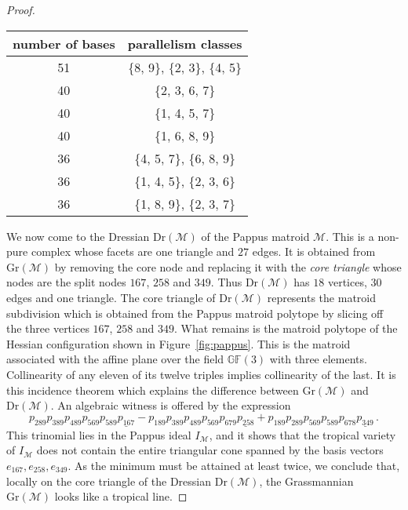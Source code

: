 \documentclass[12pt,a4paper]{amsart}
\theoremstyle{definition}
\newcommand{\Gr}{{\mathrm{Gr}}}
\newcommand{\Dr}{{\mathrm{Dr}}}
\providecommand\cM{{\mathscr{M}}}
\providecommand{\GF}{{\mathbb{GF}}}
\begin{document}
\begin{proof}
  \begin{table}[ht]\centering
    \begin{tabular*}{.5\linewidth}{@{\extracolsep{\fill}}cc@{}}
      \toprule
      number of bases  &   parallelism classes \\
      \midrule
      51          &   \{8, 9\}, \{2, 3\}, \{4, 5\}\\
      40          &        \{2, 3, 6, 7\}\\
      40          &        \{1, 4, 5, 7\}\\
      40          &        \{1, 6, 8, 9\}\\
      36          &   \{4, 5, 7\}, \{6, 8, 9\}\\
      36          &   \{1, 4, 5\}, \{2, 3, 6\}\\
      36          &   \{1, 8, 9\}, \{2, 3, 7\}\\
      \bottomrule
    \end{tabular*}
  \end{table}
  
  We now come to the Dressian $\Dr(\cM)$ of the Pappus matroid $\cM$.
  This is a non-pure complex whose facets are one triangle and $27$
  edges.  It is obtained from $\Gr(\cM)$ by removing the core
  node and replacing it with the \emph{core triangle} whose nodes are
  the split nodes $167$, $258$ and $349$.  Thus $\Dr(\cM)$ has $18$
  vertices, $30$ edges and one triangle. The core triangle of $\Dr(\cM)$
  represents the matroid subdivision which is obtained from the Pappus
  matroid polytope by slicing off the three vertices $167$, $258$ and
  $349$.  What remains is the matroid polytope of the Hessian
  configuration shown in Figure~\ref{fig:pappus}. This is the matroid
  associated with the affine plane over the field $\GF(3)$ with three
  elements.  Collinearity of any eleven of its twelve triples implies
  collinearity of the last. It is this incidence theorem which
  explains the difference between $\Gr(\cM)$ and $\Dr(\cM)$. An
  algebraic witness is offered by the expression
  \[
  p_{289} p_{389} p_{489} p_{569} p_{589} \underline{p_{167}}
  - p_{189} p_{389} p_{489} p_{569} p_{679} \underline{p_{258}}
  + p_{189} p_{289} p_{569} p_{589} p_{678} \underline{p_{349}}\, .
  \]
  This trinomial lies in the Pappus ideal $I_\cM$, and it shows that
  the tropical variety of $I_\cM$ does not contain the entire
  triangular cone spanned by the basis vectors $e_{167}, e_{258},
  e_{349}$. As the minimum must be attained at least twice, we
  conclude that, locally on the core triangle of the Dressian
  $\Dr(\cM)$, the Grassmannian $\Gr(\cM)$ looks like a tropical line.
\end{proof}
\end{document}
